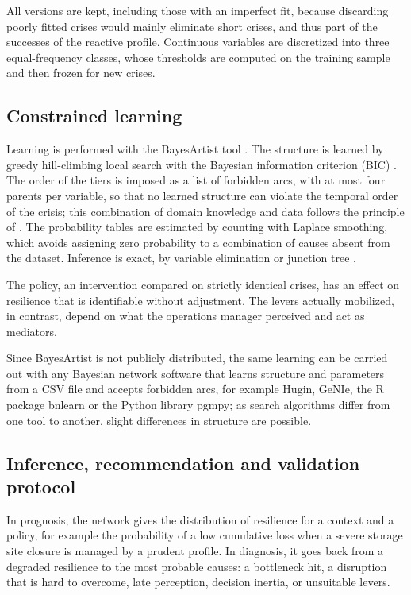 All versions are kept, including those with an imperfect fit, because discarding poorly fitted crises would mainly eliminate short crises, and thus part of the successes of the reactive profile. Continuous variables are discretized into three equal-frequency classes, whose thresholds are computed on the training sample and then frozen for new crises.

\subsection{Constrained learning}
\label{sec:S5.2}

Learning is performed with the BayesArtist tool \citep{bayesartist}. The structure is learned by greedy hill-climbing local search with the Bayesian information criterion (BIC) \citep{schwarz1978}. The order of the tiers is imposed as a list of forbidden arcs, with at most four parents per variable, so that no learned structure can violate the temporal order of the crisis; this combination of domain knowledge and data follows the principle of \citet{heckerman1995}. The probability tables are estimated by counting with Laplace smoothing, which avoids assigning zero probability to a combination of causes absent from the dataset. Inference is exact, by variable elimination or junction tree \citep{koller2009}.

The policy, an intervention compared on strictly identical crises, has an effect on resilience that is identifiable without adjustment. The levers actually mobilized, in contrast, depend on what the operations manager perceived and act as mediators.

Since BayesArtist is not publicly distributed, the same learning can be carried out with any Bayesian network software that learns structure and parameters from a CSV file and accepts forbidden arcs, for example Hugin, GeNIe, the R package bnlearn or the Python library pgmpy; as search algorithms differ from one tool to another, slight differences in structure are possible.

\subsection{Inference, recommendation and validation protocol}
\label{sec:S5.3}

In prognosis, the network gives the distribution of resilience for a context and a policy, for example the probability of a low cumulative loss when a severe storage site closure is managed by a prudent profile. In diagnosis, it goes back from a degraded resilience to the most probable causes: a bottleneck hit, a disruption that is hard to overcome, late perception, decision inertia, or unsuitable levers.

